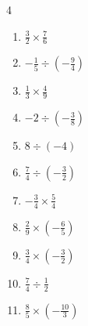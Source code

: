 \begin{multicols}{4}
\begin{enumerate}

  \item $\displaystyle \frac{3}{2}\times{}\frac{7}{6}$


  \item $\displaystyle -\frac{1}{5}\div{}\left(-\frac{9}{4}\right)$


  \item $\displaystyle \frac{1}{3}\times{}\frac{4}{9}$


  \item $\displaystyle -2\div{}\left(-\frac{3}{8}\right)$


  \item $\displaystyle 8\div{}\left(-4\right)$

        \phantom{$\displaystyle =-2$}

  \item $\displaystyle \frac{7}{4}\div{}\left(-\frac{3}{2}\right)$


  \item $\displaystyle -\frac{3}{4}\times{}\frac{5}{4}$


  \item $\displaystyle \frac{2}{9}\times{}\left(-\frac{6}{5}\right)$


  \item $\displaystyle \frac{3}{4}\times{}\left(-\frac{3}{2}\right)$


\columnbreak %

  \item $\displaystyle \frac{7}{4}\div{}\frac{1}{2}$


  \item $\displaystyle \frac{8}{5}\times{}\left(-\frac{10}{3}\right)$



\end{enumerate}
\end{multicols}
